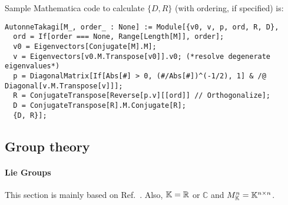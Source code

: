 \documentclass[CheatSheet]{subfiles}
\begin{document}
Sample Mathematica code to calculate $\{D,R\}$ (with ordering, if specified) is:
\begin{verbatim}
AutonneTakagi[M_, order_ : None] := Module[{v0, v, p, ord, R, D},
  ord = If[order === None, Range[Length[M]], order];
  v0 = Eigenvectors[Conjugate[M].M];
  v = Eigenvectors[v0.M.Transpose[v0]].v0; (*resolve degenerate eigenvalues*)
  p = DiagonalMatrix[If[Abs[#] > 0, (#/Abs[#])^(-1/2), 1] & /@ Diagonal[v.M.Transpose[v]]];
  R = ConjugateTranspose[Reverse[p.v][[ord]] // Orthogonalize];
  D = ConjugateTranspose[R].M.Conjugate[R];
  {D, R}];
\end{verbatim}


\subsection{Group theory}\label{sec:group-theory}

\paragraph{Lie Groups}
This section is mainly based on Ref.~\cite{Hall2015}. Also, $\mathbb{K}=\mathbb{R}$ or $\mathbb{C}$ and $M^n_{\mathbb{K}}=\mathbb{K}^{n\times n}$.
\end{document}

